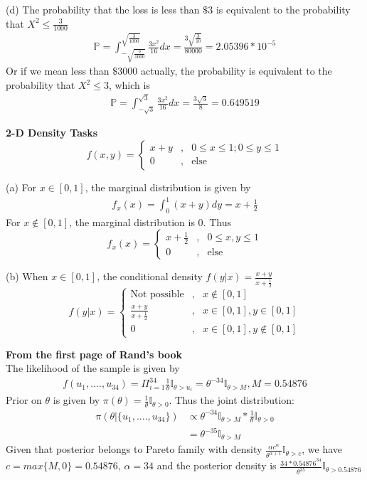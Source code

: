 \documentclass{homeworg}
\begin{document}
(d) The probability that the loss is less than $\$3$ is equivalent to the probability that $X^2\leq \frac{3}{1000}$
\begin{align*}
\mathbb{P}=\int_{-\sqrt{\frac{3}{1000}}}^{\sqrt{\frac{3}{1000}}}\frac{3x^2}{16}dx=\frac{3\sqrt{\frac{3}{10}}}{80000}=2.05396*10^{-5}
\end{align*}
Or if we mean less than $\$3000$ actually, the probability is equivalent to the probability that $X^2\leq 3$, which is 
\begin{align*}
\mathbb{P}=\int_{-\sqrt{3}}^{\sqrt{3}}\frac{3x^2}{16}dx=\frac{3\sqrt{3}}{8}=0.649519
\end{align*}



\exercise 
\textbf{2-D Density Tasks} \\
$$ f(x,y)=\left\{
\begin{aligned}
x+y &, & 0\leq x\leq 1; 0\leq y\leq 1\\
0 &,& \text{else}
\end{aligned}
\right.
$$

(a) For $x\in [0,1]$, the marginal distribution is given by 
\begin{align*}
f_x(x)=\int_{0}^{1} (x+y) dy=x+\frac{1}{2}
\end{align*}
For $x\notin[0,1]$, the marginal distribution is 0. Thus
$$ f_x(x)=\left\{
\begin{aligned}
x+\frac{1}{2} &, & 0\leq x,y\leq 1\\
0 &,& \text{else}
\end{aligned}
\right.
$$

(b) When $x\in [0,1]$, the conditional density $f(y|x)=\frac{x+y}{x+\frac{1}{2}}$ 
$$ f(y|x)=\left\{
\begin{aligned}
\text{Not possible} &, & x\notin [0,1]\\
\frac{x+y}{x+\frac{1}{2}} &,& x\in [0,1], y\in [0,1]\\
0 &,&x\in [0,1], y\notin [0,1]
\end{aligned}
\right.
$$

\exercise 
\textbf{From the first page of Rand's book} \\

The likelihood of the sample is given by 
\begin{align*}
f(u_1,....,u_{34})=\Pi_{i=1}^{34}\frac{1}{\theta}\mathbb{I}_{\theta>u_i}=\theta^{-34}\mathbb{I}_{\theta>M}, M=0.54876
\end{align*}
Prior on $\theta$ is given by $\pi(\theta)=\frac{1}{\theta}\mathbb{I}_{\theta>0}$. Thus the joint distribution:
\begin{align*}
\pi(\theta|\{u_1,....,u_{34}\})&\propto \theta^{-34}\mathbb{I}_{\theta>M}*\frac{1}{\theta}\mathbb{I}_{\theta>0} \\
&=\theta^{-35}\mathbb{I}_{\theta>M}
\end{align*}
Given that posterior belongs to Pareto family with density $\frac{\alpha c^\alpha}{\theta^{\alpha+1}}\mathbb{I}_{\theta>c}$, we have $c=max\{M,0\}=0.54876$, $\alpha=34$ and the posterior density is $\frac{34 *0.54876^{34}}{\theta^{35}}\mathbb{I}_{\theta>0.54876}$\\
\end{document}
